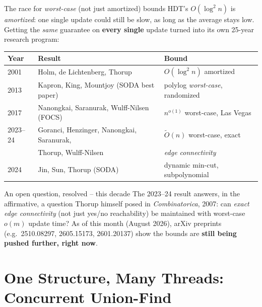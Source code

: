\documentclass[11pt,aspectratio=169]{beamer}
\begin{document}
\begin{frame}{The race for \emph{worst-case} (not just amortized) bounds}
  \small
  HDT's $O(\log^2 n)$ is \emph{amortized}: one single update could still be slow, as
  long as the average stays low. Getting the \emph{same} guarantee on \textbf{every
  single} update turned into its own 25-year research program:
  \begin{center}
  \begin{tabular}{@{}lll@{}}
    \toprule
    Year & Result & Bound \\
    \midrule
    2001 & Holm, de Lichtenberg, Thorup & $O(\log^2 n)$ amortized \\
    2013 & Kapron, King, Mountjoy (SODA best paper) & polylog \emph{worst-case}, randomized \\
    2017 & Nanongkai, Saranurak, Wulff-Nilsen (FOCS) & $n^{o(1)}$ worst-case, Las Vegas \\
    2023--24 & Goranci, Henzinger, Nanongkai, Saranurak, & $\tilde O(n)$ worst-case, exact \\
             & Thorup, Wulff-Nilsen & \emph{edge connectivity} \\
    2024 & Jin, Sun, Thorup (SODA) & dynamic min-cut, subpolynomial \\
    \bottomrule
  \end{tabular}
  \end{center}
  \begin{alertblock}{An open question, resolved -- this decade}
    The 2023--24 result answers, in the affirmative, a question Thorup himself posed
    in \emph{Combinatorica}, 2007: can \emph{exact edge connectivity} (not just
    yes/no reachability) be maintained with worst-case $o(m)$ update time? As of this
    month (August 2026), arXiv preprints (e.g.\ 2510.08297, 2605.15173, 2601.20137)
    show the bounds are \textbf{still being pushed further, right now}.
  \end{alertblock}
\end{frame}

\section{One Structure, Many Threads: Concurrent Union-Find}
\end{document}

